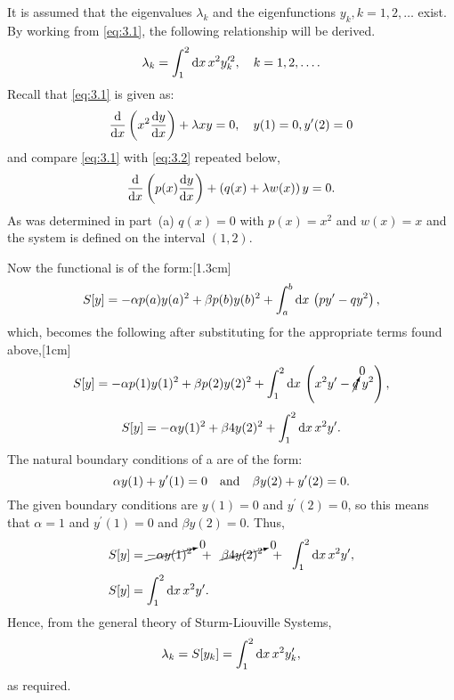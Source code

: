 It is assumed that the eigenvalues $\lambda_k$ and the eigenfunctions $y_k, k=1,2,\ldots$ exist. By working from \eqref{eq:3.1}, the following relationship will be derived.
\[
	\lambda_k = \int_{1}^{2}\mathrm{d} x\, x^2 y^{\prime2}_k, \quad k=1,2,\ldots.
\]
Recall that \eqref{eq:3.1} is given as:
\[
	\frac{\mathrm{d}}{\mathrm{d}x}\left(x^2\frac{\mathrm{d}y}{\mathrm{d}x}\right)+\lambda x y = 0,\quad y(1)=0, y^\prime(2)=0
\]
and compare \eqref{eq:3.1} with \eqref{eq:3.2} repeated below,
\[
	\frac{\mathrm{d}}{\mathrm{d}x}\left(p(x)\frac{\mathrm{d}y}{\mathrm{d}x}\right) + \left(q(x) + \lambda w(x)\right) y=0.
\]
As was determined in  part~(a) $q(x)=0$ with $p(x) = x^2$ and $w(x)=x$ and the system is defined on the interval $(1,2)$.

Now the functional is of the form:[1.3cm]
\[
	S[y] = -\alpha p(a)y(a)^2 + \beta p(b)y(b)^2 + \int_{a}^{b}\mathrm{d} x\, \left(py^\prime - qy^2\right),
\]
which, becomes the following after substituting for the appropriate terms found above,[1cm]
\[
	S[y] = -\alpha p(1)y(1)^2 + \beta p(2)y(2)^2 + \int_{1}^{2}\mathrm{d} x\, \left(x^2y^\prime - \cancelto{0}{q}\;y^2\right),
\]
\[
	S[y] = -\alpha y(1)^2 + \beta 4y(2)^2 + \int_{1}^{2}\mathrm{d} x\, x^2y^\prime.
\]
The natural boundary conditions of a \sls are of the form:
\[
	\alpha y(1) + y^\prime(1) = 0\quad\text{and}\quad \beta y(2) + y^\prime(2)= 0.
\]
The given boundary conditions are $y(1)=0$ and $y^\prime(2)=0$, so this means that $\alpha=1$ and $y^\prime(1)=0$ and $\beta y(2)=0$.
Thus,
\begin{align*}
	S[y] &= \cancelto{0}{-\alpha y(1)^2}\;\; +\;\; \cancelto{0}{\beta 4y(2)^2}\;\; +\;\; \int_{1}^{2}\mathrm{d} x\, x^2y^\prime,\\
	S[y] &= \int_{1}^{2}\mathrm{d} x\, x^2y^\prime.
\end{align*}
Hence, from the general theory of Sturm-Liouville Systems,
\[
	\lambda_k= S[y_k] = \int_{1}^{2}\mathrm{d} x\, x^2y_k^\prime,
\]
as required.